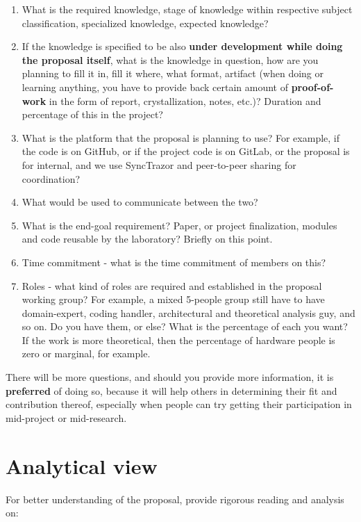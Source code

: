 \documentclass[10pt,a4paper]{article}
\begin{document}
\begin{enumerate}
    \item What is the required knowledge, stage of knowledge within respective subject classification, specialized knowledge, expected knowledge? 
    \item If the knowledge is specified to be also \textbf{under development while doing the proposal itself}, what is the knowledge in question, how are you planning to fill it in, fill it where, what format, artifact (when doing or learning anything, you have to provide back certain amount of \textbf{proof-of-work} in the form of report, crystallization, notes, etc.)? Duration and percentage of this in the project? 
    \item What is the platform that the proposal is planning to use? For example, if the code is on GitHub, or if the project code is on GitLab, or the proposal is for internal, and we use \textsf{SyncTrazor} and peer-to-peer sharing for coordination? 
    \item What would be used to communicate between the two? 
    \item What is the end-goal requirement? Paper, or project finalization, modules and code reusable by the laboratory? Briefly on this point. 
    \item Time commitment - what is the time commitment of members on this? 
    \item Roles - what kind of roles are required and established in the proposal working group? For example, a mixed 5-people group still have to have domain-expert, coding handler, architectural and theoretical analysis guy, and so on. Do you have them, or else? What is the percentage of each you want? If the work is more theoretical, then the percentage of hardware people is zero or marginal, for example.  
\end{enumerate}

There will be more questions, and should you provide more information, it is \textbf{preferred} of doing so, because it will help others in determining their fit and contribution thereof, especially when people can try getting their participation in mid-project or mid-research. 

\section*{Analytical view}
\label{sec:analytic}
For better understanding of the proposal, provide rigorous reading and analysis on: 
\end{document}
